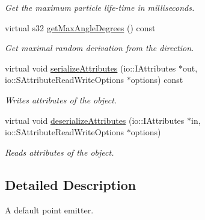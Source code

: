 \begin{DoxyCompactItemize}
\begin{DoxyCompactList}\small\item\em Get the maximum particle life-\/time in milliseconds. \end{DoxyCompactList}\item 
\hypertarget{classirr_1_1scene_1_1_c_particle_point_emitter_a5d3f104126ce2a486a548c82cde26227}{virtual s32 \hyperlink{classirr_1_1scene_1_1_c_particle_point_emitter_a5d3f104126ce2a486a548c82cde26227}{get\-Max\-Angle\-Degrees} () const }\label{classirr_1_1scene_1_1_c_particle_point_emitter_a5d3f104126ce2a486a548c82cde26227}

\begin{DoxyCompactList}\small\item\em Get maximal random derivation from the direction. \end{DoxyCompactList}\item 
\hypertarget{classirr_1_1scene_1_1_c_particle_point_emitter_aa462e110b387e566d657f3890a10186f}{virtual void \hyperlink{classirr_1_1scene_1_1_c_particle_point_emitter_aa462e110b387e566d657f3890a10186f}{serialize\-Attributes} (io\-::\-I\-Attributes $\ast$out, io\-::\-S\-Attribute\-Read\-Write\-Options $\ast$options) const }\label{classirr_1_1scene_1_1_c_particle_point_emitter_aa462e110b387e566d657f3890a10186f}

\begin{DoxyCompactList}\small\item\em Writes attributes of the object. \end{DoxyCompactList}\item 
\hypertarget{classirr_1_1scene_1_1_c_particle_point_emitter_af74ef1055c14e9e229d02d7f9180ec51}{virtual void \hyperlink{classirr_1_1scene_1_1_c_particle_point_emitter_af74ef1055c14e9e229d02d7f9180ec51}{deserialize\-Attributes} (io\-::\-I\-Attributes $\ast$in, io\-::\-S\-Attribute\-Read\-Write\-Options $\ast$options)}\label{classirr_1_1scene_1_1_c_particle_point_emitter_af74ef1055c14e9e229d02d7f9180ec51}

\begin{DoxyCompactList}\small\item\em Reads attributes of the object. \end{DoxyCompactList}\end{DoxyCompactItemize}


\subsection{Detailed Description}
A default point emitter. 

